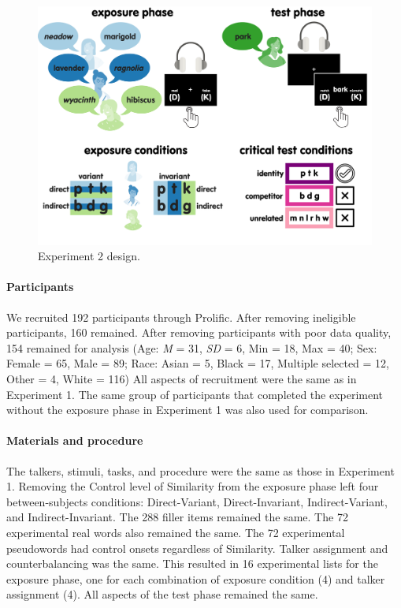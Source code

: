 \documentclass[
  12pt,
  twoside]{article}
\begin{document}
\begin{figure}[H]

{\centering \includegraphics[width=\textwidth]{figures/diss_2} 

}

\caption{Experiment 2 design.}\label{fig:exp2-fig}
\end{figure}

\hypertarget{methods-pars-1b}{%
\paragraph{Participants}\label{methods-pars-1b}}

We recruited 192 participants through Prolific.
After removing ineligible participants, 160 remained.
After removing participants with poor data quality, 154 remained for analysis (Age: \emph{M} = 31, \emph{SD} = 6, Min = 18, Max = 40; Sex: Female = 65, Male = 89; Race: Asian = 5, Black = 17, Multiple selected = 12, Other = 4, White = 116)
All aspects of recruitment were the same as in Experiment 1.
The same group of participants that completed the experiment without the exposure phase in Experiment 1 was also used for comparison.

\hypertarget{materials-and-procedure}{%
\paragraph{Materials and procedure}\label{materials-and-procedure}}

The talkers, stimuli, tasks, and procedure were the same as those in Experiment 1.
Removing the Control level of Similarity from the exposure phase left four between-subjects conditions: Direct-Variant, Direct-Invariant, Indirect-Variant, and Indirect-Invariant.
The 288 filler items remained the same.
The 72 experimental real words also remained the same.
The 72 experimental pseudowords had control onsets regardless of Similarity.
Talker assignment and counterbalancing was the same.
This resulted in 16 experimental lists for the exposure phase, one for each combination of exposure condition (4) and talker assignment (4).
All aspects of the test phase remained the same.
\end{document}
